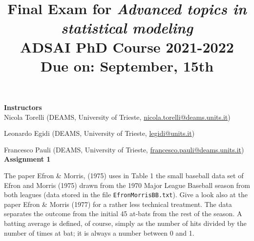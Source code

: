 \title{\large{
\textbf{Final Exam for \emph{Advanced topics in statistical modeling}}\\
ADSAI PhD Course 2021-2022 }\\
Due on: September, 15th}
%
%
\date{}
\maketitle
%
\hspace{-0.8cm}
\textbf{Instructors} \\

Nicola Torelli (DEAMS, University of Trieste, \url{nicola.torelli@deams.units.it})

Leonardo Egidi (DEAMS, University of Trieste, \url{legidi@units.it})

Francesco Pauli (DEAMS, University of Trieste, \url{francesco.pauli@deams.units.it})\\

\hspace{-0.8cm}
\textbf{Assignment 1}
\vspace{0.5cm}

The paper Efron \& Morris, (1975) uses in Table 1 the small baseball data set of Efron and Morris (1975) drawn from the 1970 Major League Baseball season from both leagues (data stored in the file \texttt{EfronMorrisBB.txt}). Give a look also at the paper Efron \& Morris (1977) for a rather less technical treatment.  The data separates the outcome from the initial 45 at-bats from the rest of the season. A
batting average is defined, of course, simply as the number of hits divided by
the number of times at bat; it is always a number between 0 and 1.

